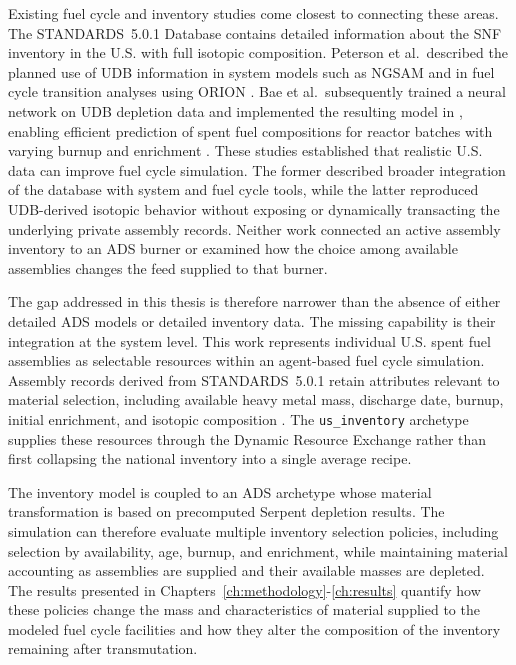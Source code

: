 Existing fuel cycle and inventory studies come closest to connecting these
areas. The \gls{STANDARDS}~5.0.1 Database contains detailed information
about the \gls{SNF} inventory in the U.S. with full isotopic composition.
Peterson et al.\ described the planned use of \gls{UDB} information in system models
such as \gls{NGSAM} and in fuel cycle transition analyses using ORION
\cite{peterson_additional_2017}. Bae et al.\ subsequently trained a neural
network on \gls{UDB} depletion data and implemented the resulting model in
\Cyclus, enabling efficient prediction of spent fuel compositions for
reactor batches with varying burnup and enrichment
\cite{bae_deep_2020}. These studies established that realistic U.S. data can
improve fuel cycle simulation. The former described broader integration of
the database with system and fuel cycle tools, while the latter reproduced
\gls{UDB}-derived isotopic behavior without exposing or dynamically transacting
the underlying private assembly records. Neither work connected an active
assembly inventory to an \gls{ADS} burner or examined how the choice among
available assemblies changes the feed supplied to that burner.

The gap addressed in this thesis is therefore narrower than the absence of
either detailed \gls{ADS} models or detailed inventory data. The missing capability
is their integration at the system level. This work represents individual
U.S. spent fuel assemblies as selectable resources within an agent-based
fuel cycle simulation. Assembly records derived from \gls{STANDARDS}~5.0.1 retain
attributes relevant to material selection, including available heavy metal
mass, discharge date, burnup, initial enrichment, and isotopic composition
\cite{carter_banerjee_inventory_2024}. The
\texttt{us\_inventory} archetype supplies these resources through the
\Cyclus Dynamic Resource Exchange rather than first collapsing the national
inventory into a single average recipe.

The inventory model is coupled to an \gls{ADS} archetype whose material
transformation is based on precomputed Serpent depletion results. The
simulation can therefore evaluate multiple inventory selection policies,
including selection by availability, age, burnup, and enrichment, while
maintaining material accounting as assemblies are supplied and their
available masses are depleted. The results presented in
Chapters~\ref{ch:methodology}-\ref{ch:results} quantify how these policies
change the mass and characteristics of material supplied to the modeled
fuel cycle facilities and how they alter the composition of the inventory
remaining after transmutation.

